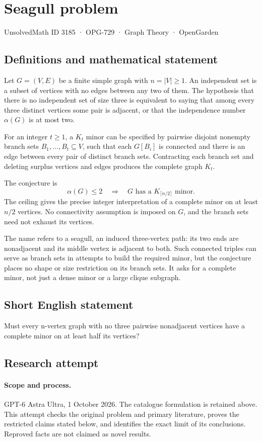 \documentclass[11pt,a4paper]{article}
\begin{document}
\section*{Seagull problem}\label{3185}
{\small UnsolvedMath ID 3185 · OPG-729 · Graph Theory · OpenGarden}
\subsection{Definitions and mathematical statement}
Let $G=(V,E)$ be a finite simple graph with
$n=|V|\geq1$. An independent set is a subset of vertices
with no edges between any two of them. The hypothesis
that there is no independent set of size three is
equivalent to saying that among every three distinct
vertices some pair is adjacent, or that the independence
number $\alpha(G)$ is at most two.

For an integer $t\geq1$, a $K_t$ minor can be specified
by pairwise disjoint nonempty branch sets
$B_1,\ldots,B_t\subseteq V$, such that each $G[B_i]$
is connected and there is an edge between every pair
of distinct branch sets. Contracting each branch set
and deleting surplus vertices and edges produces the
complete graph $K_t$.

The conjecture is
\[
 \alpha(G)\leq2\quad\Longrightarrow\quad
 G\text{ has a }K_{\lceil n/2\rceil}\text{ minor}.
\]
The ceiling gives the precise integer interpretation
of a complete minor on at least $n/2$ vertices.
No connectivity assumption is imposed on $G$, and
the branch sets need not exhaust its vertices.

The name refers to a seagull, an induced three-vertex
path: its two ends are nonadjacent and its middle
vertex is adjacent to both. Such connected triples
can serve as branch sets in attempts to build the
required minor, but the conjecture places no shape
or size restriction on its branch sets. It asks
for a complete minor, not just a dense minor or
a large clique subgraph.
\subsection{Short English statement}
Must every n-vertex graph with no three pairwise nonadjacent vertices have a complete minor on at least half its vertices?
\subsection{Research attempt}
\paragraph{Scope and process.}
GPT-6 Astra Ultra, 1 October 2026. The catalogue formulation is retained above. This attempt checks the original problem and primary literature, proves the restricted claims stated below, and identifies the exact limit of its conclusions. Reproved facts are not claimed as novel results.
\end{document}
